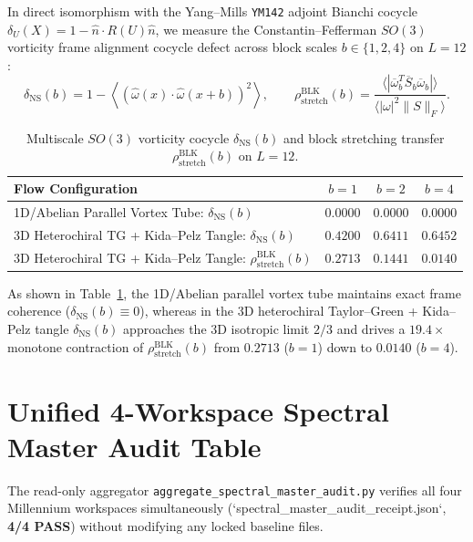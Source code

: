 \documentclass[11pt,a4paper]{article}
\begin{document}
In direct isomorphism with the Yang--Mills \texttt{YM142} adjoint Bianchi cocycle $\delta_U(X) = 1 - \hat{n}\cdot R(U)\hat{n}$, we measure the Constantin--Fefferman $SO(3)$ vorticity frame alignment cocycle defect across block scales $b \in \{1, 2, 4\}$ on $L=12$:
\begin{equation}
  \delta_{\mathrm{NS}}(b) = 1 - \left\langle \left(\hat{\omega}(x)\cdot\hat{\omega}(x+b)\right)^2 \right\rangle, \qquad
  \rho_{\mathrm{stretch}}^{\mathrm{BLK}}(b) = \frac{\langle |\overline{\omega}_b^T \overline{S}_b \overline{\omega}_b| \rangle}{\langle |\omega|^2 \|S\|_F \rangle}.
\end{equation}

\begin{table}[htbp]
\centering
\caption{Multiscale $SO(3)$ vorticity cocycle $\delta_{\mathrm{NS}}(b)$ and block stretching transfer $\rho_{\mathrm{stretch}}^{\mathrm{BLK}}(b)$ on $L=12$.}
\label{tab:cocycle}
\begin{tabular}{lccc}
\toprule
Flow Configuration & $b = 1$ & $b = 2$ & $b = 4$ \\
\midrule
1D/Abelian Parallel Vortex Tube: $\delta_{\mathrm{NS}}(b)$ & $0.0000$ & $0.0000$ & $0.0000$ \\
3D Heterochiral TG + Kida--Pelz Tangle: $\delta_{\mathrm{NS}}(b)$ & $0.4200$ & $0.6411$ & $0.6452$ \\
3D Heterochiral TG + Kida--Pelz Tangle: $\rho_{\mathrm{stretch}}^{\mathrm{BLK}}(b)$ & $0.2713$ & $0.1441$ & $0.0140$ \\
\bottomrule
\end{tabular}
\end{table}

As shown in Table~\ref{tab:cocycle}, the 1D/Abelian parallel vortex tube maintains exact frame coherence ($\delta_{\mathrm{NS}}(b) \equiv 0$), whereas in the 3D heterochiral Taylor--Green + Kida--Pelz tangle $\delta_{\mathrm{NS}}(b)$ approaches the 3D isotropic limit $2/3$ and drives a $19.4\times$ monotone contraction of $\rho_{\mathrm{stretch}}^{\mathrm{BLK}}(b)$ from $0.2713$ ($b=1$) down to $0.0140$ ($b=4$).

\section{Unified 4-Workspace Spectral Master Audit Table}

The read-only aggregator \texttt{aggregate\_spectral\_master\_audit.py} verifies all four Millennium workspaces simultaneously (`spectral\_master\_audit\_receipt.json`, \textbf{4/4 PASS}) without modifying any locked baseline files.
\end{document}
